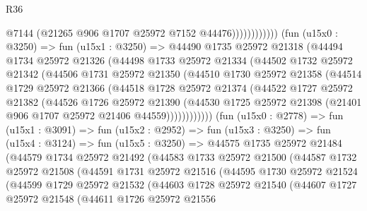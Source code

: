 \begin{lexlean}{R36}
\begin{coremodule}
                              @7144
                              (@21265 @906 @1707 @25972 @7152 @44476))))))))))))
        (fun (u15x0 : @3250) =>
        fun (u15x1 : @3250) =>
        @44490
          @1735
          @25972
          @21318
          (@44494
            @1734
            @25972
            @21326
            (@44498
              @1733
              @25972
              @21334
              (@44502
                @1732
                @25972
                @21342
                (@44506
                  @1731
                  @25972
                  @21350
                  (@44510
                    @1730
                    @25972
                    @21358
                    (@44514
                      @1729
                      @25972
                      @21366
                      (@44518
                        @1728
                        @25972
                        @21374
                        (@44522
                          @1727
                          @25972
                          @21382
                          (@44526
                            @1726
                            @25972
                            @21390
                            (@44530
                              @1725
                              @25972
                              @21398
                              (@21401 @906 @1707 @25972 @21406 @44559))))))))))))
        (fun (u15x0 : @2778) =>
        fun (u15x1 : @3091) =>
        fun (u15x2 : @2952) =>
        fun (u15x3 : @3250) =>
        fun (u15x4 : @3124) =>
        fun (u15x5 : @3250) =>
        @44575
          @1735
          @25972
          @21484
          (@44579
            @1734
            @25972
            @21492
            (@44583
              @1733
              @25972
              @21500
              (@44587
                @1732
                @25972
                @21508
                (@44591
                  @1731
                  @25972
                  @21516
                  (@44595
                    @1730
                    @25972
                    @21524
                    (@44599
                      @1729
                      @25972
                      @21532
                      (@44603
                        @1728
                        @25972
                        @21540
                        (@44607
                          @1727
                          @25972
                          @21548
                          (@44611
                            @1726
                            @25972
                            @21556

\end{coremodule}
\end{lexlean}
